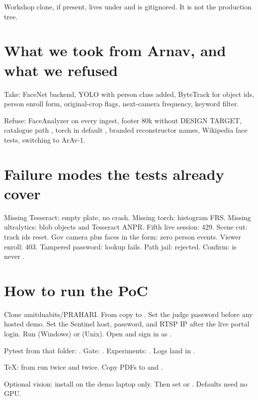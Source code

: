 \documentclass[listings]{csf301-notes}
\begin{document}
Workshop clone, if present, lives under  and is gitignored. It is not the production tree.

\section{What we took from Arnav, and what we refused}
Take: FaceNet backend, YOLO with person class added, ByteTrack for object ids, person enroll form, original-crop flags, next-camera frequency, keyword filter.

Refuse: FaceAnalyzer on every ingest, footer 80k without DESIGN TARGET, catalogue path , torch in default , branded reconstructor names, Wikipedia face tests, switching  to ArAv-1.

\section{Failure modes the tests already cover}
Missing Tesseract: empty plate, no crash. Missing torch: histogram FRS. Missing ultralytics: blob objects and Tesseract ANPR. Fifth live session: 429. Scene cut: track ids reset. Gov camera plus faces in the form: zero person events. Viewer enroll: 403. Tampered password: lookup fails. Path jail:  rejected. Confirm:  is never .

\section{How to run the PoC}
Clone amitduabits/PRAHARI. From  copy  to . Set the judge password before any hosted demo. Set the Sentinel host, password, and RTSP IP after the live portal login. Run  (Windows) or  (Unix). Open  and sign in as .

Pytest from that folder: . Gate: . Experiments: . Logs land in .

TeX: from  run  twice and  twice. Copy PDFs to  and .

Optional vision: install  on the demo laptop only. Then set  or . Defaults need no GPU.
\end{document}
